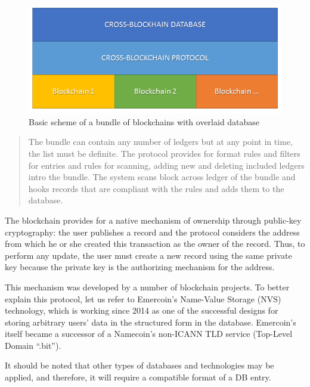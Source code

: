 \begin{multicols}{2}
\begin{figure}[H]
\centering
\includegraphics[scale=1.5]{src/Figures/chap1/chap1-fig01.jpg}
\caption{Basic scheme of a bundle of blockchains with overlaid database}\label{chap1-fig01}
\end{figure}

\begin{quote}
The bundle can contain any number of ledgers but at any point in time, the list must be definite. The protocol provides for format rules and filters for entries and rules for scanning, adding new and deleting included ledgers intro the bundle. The system scans block across ledger of the bundle and hooks records that are compliant with the rules and adds them to the database.
\end{quote}

\vspace{.1cm}

The blockchain provides for a native mechanism of ownership through public-key cryptography: the user publishes a record and the protocol considers the address from which he or she created this transaction as the owner of the record. Thus, to perform any update, the user must create a new record using the same private key because the private key is the authorizing mechanism for the address.

\vspace{.1cm}

This mechanism was developed by a number of blockchain projects. To better explain this protocol, let us refer to Emercoin’s Name-Value Storage (NVS) technology, which is working since 2014 as one of the successful designs for storing arbitrary users’ data in the structured form in the database. Emercoin’s itself became a successor of a Namecoin’s non-ICANN TLD service (Top-Level Domain “.bit”).

\vspace{.5cm}

It should be noted that other types of databases and technologies may be applied, and therefore, it will require a compatible format of a DB entry.


\end{multicols}
